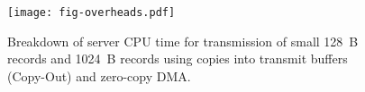 \begin{figure}[t]
\texttt{[image: fig-overheads.pdf]}
\caption{Breakdown of server CPU time for transmission of small 128~B records
  and 1024~B records using copies into transmit buffers (Copy-Out)
  and zero-copy DMA.}
\label{fig:overheads}
\end{figure}

